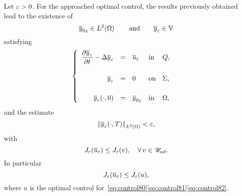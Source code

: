 Let $\varepsilon > 0$. For the approached optimal control, the results previously
obtained lead to the existence of
\begin{equation*}
    {\overline{y}_{0}}_{\varepsilon}\in L^{2}\!\left({\Omega}\right)\qquad\text{and}\qquad
    {\overline{y}}_{\varepsilon}\in\mathbb{V}
\end{equation*}
satisfying
\begin{equation}\label{eq:control89}
    \begin{cases}\displaystyle
        \begin{array}{rclll}
            \dfrac{\partial{}{\overline{y}}_{\varepsilon}}{\partial{}t} - \Delta{\overline{y}}_{\varepsilon} & = & {\overline{u}}_{\varepsilon} &
            \text{in} & Q,\\
            \\
            {\overline{y}}_{\varepsilon} & = & 0 & \text{on} & \Sigma,\\
            \\
            {{\overline{y}}_{\varepsilon}}\!\left({\cdot, 0}\right) & = & {\overline{y}_{0}}_{\varepsilon} &
            \text{in} & \Omega,
        \end{array}
    \end{cases}
\end{equation}
and the estimate
\begin{equation*}
    {\left\|{ { {\overline{y}}_{\varepsilon} }\!\left({\cdot,T}\right)   }\right\|}_{L^{2}\left({\Omega}\right)} < \varepsilon,
\end{equation*}
with
\begin{equation*}
    J_{\varepsilon}\!\left({{\overline{u}}_{\varepsilon}}\right)\leq J_{\varepsilon}(v),\quad
    \forall\,v\in{\mathscr{U}}_{ad}.
\end{equation*}
In particular
\begin{equation}\label{eq:control92}
    J_{\varepsilon}\!\left({{\overline{u}}_{\varepsilon}}\right) \leq J_{\varepsilon}(u),
\end{equation}
where $u$ is the optimal control
for~\eqref{eq:control80}\eqref{eq:control81}\eqref{eq:control82}.

